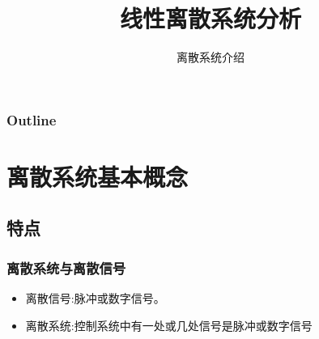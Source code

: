 \documentclass[table]{beamer}
\subtitle{离散系统介绍}
\title{线性离散系统分析}
\author{}
\date{}
\begin{document}
\maketitle

\begin{frame}
\frametitle{Outline}
\setcounter{tocdepth}{3}
\tableofcontents
\end{frame}













\section{离散系统基本概念}
\label{sec-1}
\subsection{特点}
\label{sec-1-1}
\begin{frame}
\frametitle{离散系统与离散信号}
\label{sec-1-1-1}

\begin{itemize}
\item <2->离散信号:脉冲或数字信号。
\item <3->离散系统:控制系统中有一处或几处信号是脉冲或数字信号
\end{itemize}
\end{frame}
\end{document}
